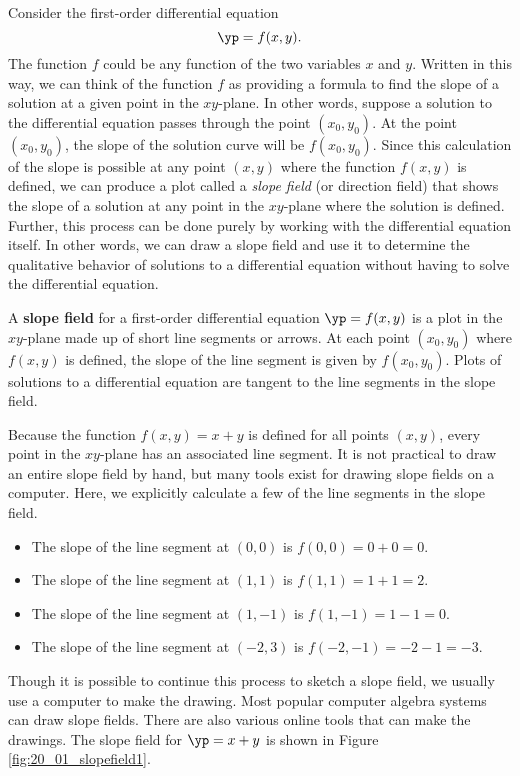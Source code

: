Consider the first-order differential equation
\[\yp = f(x,y).\]
The function $f$ could be any function of the two variables $x$ and $y$.  Written in this way, we can think of the function $f$ as providing a formula to find the slope of a solution at a given point in the $xy$-plane.  In other words, suppose a solution to the differential equation passes through the point $(x_0,y_0)$.  At the point $(x_0,y_0)$, the slope of the solution curve will be $f(x_0,y_0).$  Since this calculation of the slope is possible at any point $(x,y)$ where the function $f(x,y)$ is defined, we can produce a plot called a \emph{slope field} (or direction field) that shows the slope of a solution at any point in the $xy$-plane where the solution is defined.  Further, this process can be done purely by working with the differential equation itself.  In other words, we can draw a slope field and use it to determine the qualitative behavior of solutions to a differential equation without having to solve the differential equation.

{A \textbf{slope field} for a first-order differential equation $\yp = f(x,y)$ is a plot in the $xy$-plane made up of short line segments or arrows. At each point $(x_0,y_0)$ where $f(x,y)$ is defined, the slope of the line segment is given by $f(x_0,y_0)$. Plots of solutions to a differential equation are tangent to the line segments in the slope field.}\\

{Because the function $f(x,y) = x+y$ is defined for all points $(x,y)$, every point in the $xy$-plane has an associated line segment. It is not practical to draw an entire slope field by hand, but many tools exist for drawing slope fields on a computer.  Here, we explicitly calculate  a few of the line segments in the slope field.

\begin{itemize}
\item The slope of the line segment at $(0,0)$ is $f(0,0) = 0 + 0 = 0.$
\item The slope of the line segment at $(1,1)$ is $f(1,1) = 1 + 1 = 2.$
\item The slope of the line segment at $(1,-1)$ is $f(1,-1) = 1 - 1 = 0.$
\item The slope of the line segment at $(-2,3)$ is $f(-2,-1) = -2 - 1 = -3.$
\end{itemize}

Though it is possible to continue this process to sketch a slope field, we usually use a computer to make the drawing.  Most popular computer algebra systems can draw slope fields.  There are also various online tools that can make the drawings.  The slope field for $\yp = x+y$ is shown in Figure \ref{fig:20_01_slopefield1}.
}\\

